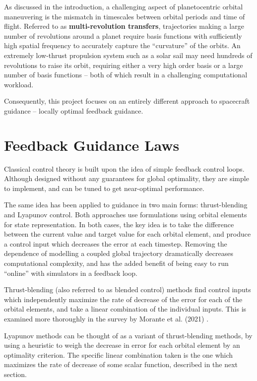 As discussed in the introduction, a challenging aspect of planetocentric orbital maneuvering is the mismatch in timescales between orbital periods and time of flight. Referred to as \textbf{multi-revolution transfers}, trajectories making a large number of revolutions around a planet require basis functions with sufficiently high spatial frequency to accurately capture the ``curvature'' of the orbits. An extremely low-thrust propulsion system such as a solar sail may need hundreds of revolutions to raise its orbit, requiring either a very high order basis or a large number of basis functions -- both of which result in a challenging computational workload.

Consequently, this project focuses on an entirely different approach to spacecraft guidance -- locally optimal feedback guidance.

\section{Feedback Guidance Laws}
Classical control theory is built upon the idea of simple feedback control loops. Although designed without any guarantees for global optimality, they are simple to implement, and can be tuned to get near-optimal performance.

The same idea has been applied to guidance in two main forms: thrust-blending and Lyapunov control. Both approaches use formulations using orbital elements for state representation. In both cases, the key idea is to take the difference between the current value and target value for each orbital element, and produce a control input which decreases the error at each timestep. Removing the dependence of modelling a coupled global trajectory dramatically decreases computational complexity, and has the added benefit of being easy to run ``online'' with simulators in a feedback loop.

Thrust-blending (also referred to as blended control) methods find control inputs which independently maximize the rate of decrease of the error for each of the orbital elements, and take a linear combination of the individual inputs. This is examined more thoroughly in the survey by Morante et al. (2021) \cite{morante2021survey}.

Lyapunov methods can be thought of as a variant of thrust-blending methods, by using a heuristic to weigh the decrease in error for each orbital element by an optimality criterion. The specific linear combination taken is the one which maximizes the rate of decrease of some scalar function, described in the next section.

